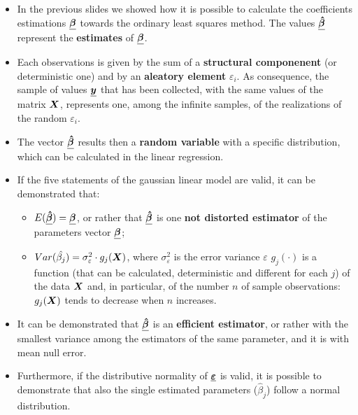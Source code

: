 
\begin{frame}
  \vspace*{.25cm}
  \begin{itemize}
    \item In the previous slides we showed how it is possible to calculate the coefficients estimations  $ \boldsymbol{\underline{\beta}} $ towards the ordinary least squares method. The values $ \boldsymbol{\underline{\hat{\beta}}} $ represent the \textbf{estimates} of $ \boldsymbol{\underline{\beta}} $.
    \vspace*{.25cm}
    \item Each observations is given by the sum of a \textbf{structural componenent} (or deterministic one) and by an \textbf{aleatory element} {$ \varepsilon_i $}. As consequence, the sample of values $ \boldsymbol{\underline{y}} $ that has been collected, with the same values of the matrix $ \boldsymbol{X} $, represents one, among the infinite samples, of the realizations of the random $ \varepsilon_i $.
    \vspace*{.25cm}
    \item The vector $ \boldsymbol{\underline{\hat{\beta}}} $ results then a \textbf{random variable} with a specific distribution, which can be calculated in the linear regression.
  \end{itemize}
\end{frame}

\begin{frame}
  \vspace*{.25cm}
  \begin{itemize}
    \item If the five statements of the gaussian linear model are valid, it can be demonstrated that:
    \begin{itemize}
      \item $ E(\boldsymbol{\underline{\hat{\beta}}}) = \boldsymbol{\underline{\beta}} $, or rather that $ \boldsymbol{\underline{\hat{\beta}}} $ is one \textbf{not distorted estimator} of the parameters vector $ \boldsymbol{\underline{\beta}} $;
      \item $ Var(\hat{\beta_{j}}) = \sigma^2_{\varepsilon} \cdot g_j(\boldsymbol{X})$, where $\sigma^2_{\varepsilon}$ is the error variance $\varepsilon$  $g_j(\cdot)$ is a function (that can be calculated, deterministic and different for each $ j $) of the data  $ \boldsymbol{X} $ and, in particular, of the number $ n $ of sample observations: $ g_j(\boldsymbol{X})$ tends to decrease when $n $ increases.
    \end{itemize}
    \vspace*{.25cm}
    \item It can be demonstrated that { $\boldsymbol{\underline{\hat{\beta}}} $ } is an \textbf{efficient estimator}, or rather with the smallest variance among the estimators of the same parameter, and it is with mean null error.
    \vspace*{.25cm}
    \item Furthermore, if the distributive normality of $ \boldsymbol{\underline{\varepsilon}} $ is valid, it is possible to demonstrate that also the single estimated parameters ($ \hat{\beta}_j $) follow a normal distribution. 
  \end{itemize}
\end{frame}

